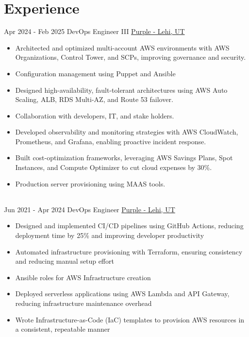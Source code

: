 \documentclass[letterpaper]{tenseconds} %
\begin{document}
\section{Experience}
\begin{twenty} %
	\twentyitem
	{Apr 2024 - }
	{Feb 2025}
	{DevOps Engineer III}
	{\href{https://purple.com/}{Purple - Lehi, UT}}
	{}
	{\begin{itemize}
		\item Architected and optimized multi-account AWS environments with AWS Organizations, Control Tower, and SCPs, improving governance and security.
		\item Configuration management using Puppet and Ansible
		\item Designed high-availability, fault-tolerant architectures using AWS Auto Scaling, ALB, RDS Multi-AZ, and Route 53 failover.
		\item Collaboration with developers, IT, and stake holders.
		\item Developed observability and monitoring strategies with AWS CloudWatch, Prometheus, and Grafana, enabling proactive incident response.
		\item Built cost-optimization frameworks, leveraging AWS Savings Plans, Spot Instances, and Compute Optimizer to cut cloud expenses by 30\%.
		\item Production server provisioning using MAAS tools.
		\end{itemize}}
	\\
	\twentyitem
	{Jun 2021 -}
	{Apr 2024}
	{DevOps Engineer}
	{\href{https://purple.com/}{Purple - Lehi, UT}}
	{}
	{\begin{itemize}
    \item Designed and implemented CI/CD pipelines using GitHub Actions, reducing deployment time by 25\% and improving developer productivity
    \item Automated infrastructure provisioning with Terraform, ensuring consistency and reducing manual setup effort
		\item Ansible roles for AWS Infrastructure creation
		\item Deployed serverless applications using AWS Lambda and API Gateway, reducing infrastructure maintenance overhead
    \item Wrote Infrastructure-as-Code (IaC) templates to provision AWS resources in a consistent, repeatable manner

\end{itemize}}
\end{twenty}
\end{document}
